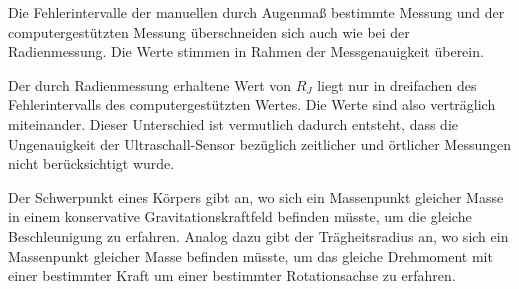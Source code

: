         Die Fehlerintervalle der manuellen durch Augenmaß bestimmte Messung und der computergestützten Messung überschneiden sich auch wie bei der Radienmessung. Die Werte stimmen in Rahmen der Messgenauigkeit überein. 

        Der durch Radienmessung erhaltene Wert von $R_J$ liegt nur in dreifachen des Fehlerintervalls des computergestützten Wertes. Die Werte sind also verträglich miteinander. Dieser Unterschied ist vermutlich dadurch entsteht, dass die Ungenauigkeit der Ultraschall-Sensor bezüglich zeitlicher und örtlicher Messungen nicht berücksichtigt wurde.

        Der Schwerpunkt eines Körpers gibt an, wo sich ein Massenpunkt gleicher Masse in einem konservative Gravitationskraftfeld befinden müsste, um die gleiche Beschleunigung zu erfahren. Analog dazu gibt der Trägheitsradius an, wo sich ein Massenpunkt gleicher Masse befinden müsste, um das gleiche Drehmoment mit einer bestimmter Kraft um einer bestimmter Rotationsachse zu erfahren.
